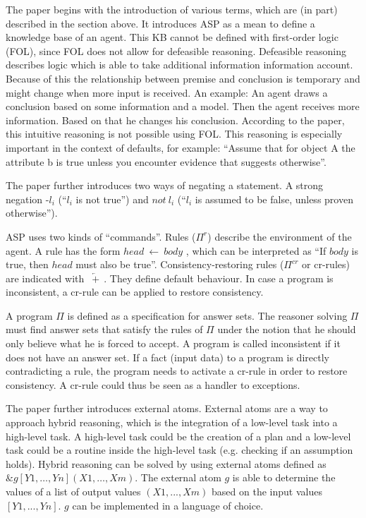 \documentclass[runningheads]{llncs}
\begin{document}
The paper begins with the introduction of various terms, which are (in part) described in the section above. It introduces ASP as a mean to define a knowledge base of an agent. This KB cannot be defined with first-order logic (FOL), since FOL does not allow for defeasible reasoning. Defeasible reasoning\cite{sep} describes logic which is able to take additional information information account. Because of this the relationship between premise and conclusion is temporary and might change when more input is received. An example: An agent draws a conclusion based on some information and a model. Then the agent receives more information. Based on that he changes his conclusion. According to the paper, this intuitive reasoning is not possible using FOL. This reasoning is especially important in the context of defaults, for example: ``Assume that for object A the attribute b is true unless you encounter evidence that suggests otherwise''.


The paper further introduces two ways of negating a statement. A strong negation -$l_i$ (``$l_i$ is not true'') and $not ~ l_i$ (``$l_i$ is assumed to be false, unless proven otherwise'').

ASP uses two kinds of ``commands''. Rules ($\Pi^r$) describe the environment of the agent. A rule has the form $head  ~ \leftarrow ~ body$ , which can be interpreted as ``If $body$ is true, then $head$ must also be true''. Consistency-restoring rules ($\Pi^{cr}$ or cr-rules) are indicated with $\underleftarrow{~+~}$. They define default behaviour. In case a program is inconsistent, a cr-rule can be applied to restore consistency. 


A program $\Pi$ is defined as a specification for answer sets. The reasoner solving $\Pi$ must find answer sets that satisfy the rules of $\Pi$ under the notion that he should only believe what he is forced to accept. A program is called inconsistent if it does not have an answer set. If a fact (input data) to a program is directly contradicting a rule, the program needs to activate a cr-rule in order to restore consistency. A cr-rule could thus be seen as a handler to exceptions. 

The paper further introduces external atoms. External atoms are a way to approach hybrid reasoning, which is the integration of a low-level task into a high-level task. A high-level task could be the creation of a plan and a low-level task could be a routine inside the high-level task (e.g. checking if an assumption holds). Hybrid reasoning can be solved by using external atoms defined as $\&g[Y1, …, Yn](X1, …, Xm)$. The external atom $g$ is able to determine the values of a list of output values $(X1, ..., Xm)$ based on the input values $[Y1, ..., Yn]$. $g$ can be implemented in a language of choice. 
\end{document}
